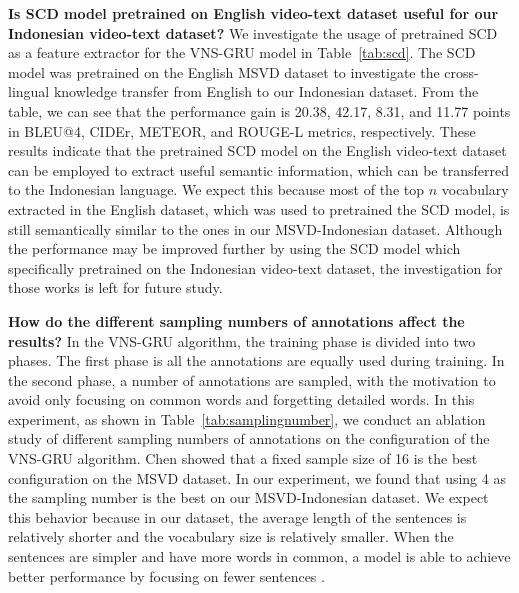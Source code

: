 \documentclass{article}
\begin{document}
\textbf{Is SCD model pretrained on English video-text dataset useful for our Indonesian video-text dataset?} We investigate the usage of pretrained SCD as a feature extractor for the VNS-GRU model in Table~\ref{tab:scd}. The SCD model was pretrained on the English MSVD dataset to investigate the cross-lingual knowledge transfer from English to our Indonesian dataset. From the table, we can see that the performance gain is 20.38, 42.17, 8.31, and 11.77 points in BLEU@4, CIDEr, METEOR, and ROUGE-L metrics, respectively. These results indicate that the pretrained SCD model on the English video-text dataset can be employed to extract useful semantic information, which can be transferred to the Indonesian language. We expect this because most of the top $n$ vocabulary extracted in the English dataset, which was used to pretrained the SCD model, is still semantically similar to the ones in our MSVD-Indonesian dataset. Although the performance may be improved further by using the SCD model which specifically pretrained on the Indonesian video-text dataset, the investigation for those works is left for future study.



\textbf{How do the different sampling numbers of annotations affect the results?} In the VNS-GRU algorithm, the training phase is divided into two phases. The first phase is all the annotations are equally used during training. In the second phase, a number of annotations are sampled, with the motivation to avoid only focusing on common words and forgetting detailed words. In this experiment, as shown in Table~\ref{tab:samplingnumber}, we conduct an ablation study of different sampling numbers of annotations on the configuration of the VNS-GRU algorithm. Chen \etal showed that a fixed sample size of 16 is the best configuration on the MSVD dataset. In our experiment, we found that using 4 as the sampling number is the best on our MSVD-Indonesian dataset. We expect this behavior because in our dataset, the average length of the sentences is relatively shorter and the vocabulary size is relatively smaller. When the sentences are simpler and have more words in common, a model is able to achieve better performance by focusing on fewer sentences \cite{DBLP:conf/ecai/Chen0020a}.
\end{document}
